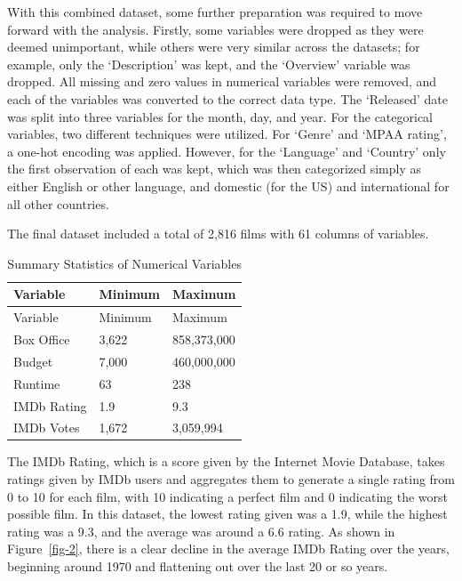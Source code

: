\documentclass[
]{agujournal2019}
\begin{document}
With this combined dataset, some further preparation was required to
move forward with the analysis. Firstly, some variables were dropped as
they were deemed unimportant, while others were very similar across the
datasets; for example, only the `Description' was kept, and the
`Overview' variable was dropped. All missing and zero values in
numerical variables were removed, and each of the variables was
converted to the correct data type. The `Released' date was split into
three variables for the month, day, and year. For the categorical
variables, two different techniques were utilized. For `Genre' and `MPAA
rating', a one-hot encoding was applied. However, for the `Language' and
`Country' only the first observation of each was kept, which was then
categorized simply as either English or other language, and domestic
(for the US) and international for all other countries.

The final dataset included a total of 2,816 films with 61 columns of
variables.

\begin{longtable}[]{@{}lll@{}}
\caption{Summary Statistics of Numerical
Variables}\label{tbl-3}\tabularnewline
\toprule\noalign{}
Variable & Minimum & Maximum \\
\midrule\noalign{}
\endfirsthead
\toprule\noalign{}
Variable & Minimum & Maximum \\
\midrule\noalign{}
\endhead
\bottomrule\noalign{}
\endlastfoot
Box Office & 3,622 & 858,373,000 \\
Budget & 7,000 & 460,000,000 \\
Runtime & 63 & 238 \\
IMDb Rating & 1.9 & 9.3 \\
IMDb Votes & 1,672 & 3,059,994 \\
\end{longtable}

The IMDb Rating, which is a score given by the Internet Movie Database,
takes ratings given by IMDb users and aggregates them to generate a
single rating from 0 to 10 for each film, with 10 indicating a perfect
film and 0 indicating the worst possible film. In this dataset, the
lowest rating given was a 1.9, while the highest rating was a 9.3, and
the average was around a 6.6 rating. As shown in Figure~\ref{fig-2},
there is a clear decline in the average IMDb Rating over the years,
beginning around 1970 and flattening out over the last 20 or so years.
\end{document}
